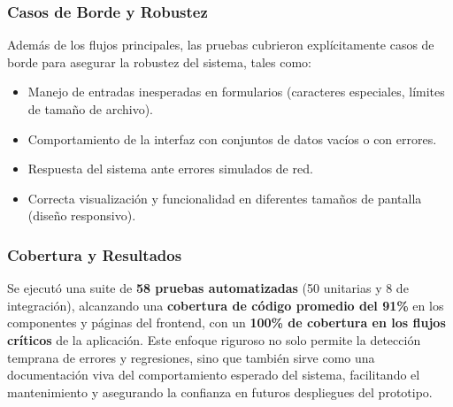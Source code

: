 \subsubsection{Casos de Borde y Robustez}

Además de los flujos principales, las pruebas cubrieron explícitamente casos de borde para asegurar la robustez del sistema, tales como:

\begin{itemize}
    \item Manejo de entradas inesperadas en formularios (caracteres especiales, límites de tamaño de archivo).
    \item Comportamiento de la interfaz con conjuntos de datos vacíos o con errores.
    \item Respuesta del sistema ante errores simulados de red.
    \item Correcta visualización y funcionalidad en diferentes tamaños de pantalla (diseño responsivo).
\end{itemize}

\subsubsection{Cobertura y Resultados}

Se ejecutó una suite de \textbf{58 pruebas automatizadas} (50 unitarias y 8 de integración), alcanzando una \textbf{cobertura de código promedio del 91\%} en los componentes y páginas del frontend, con un \textbf{100\% de cobertura en los flujos críticos} de la aplicación. Este enfoque riguroso no solo permite la detección temprana de errores y regresiones, sino que también sirve como una documentación viva del comportamiento esperado del sistema, facilitando el mantenimiento y asegurando la confianza en futuros despliegues del prototipo.
